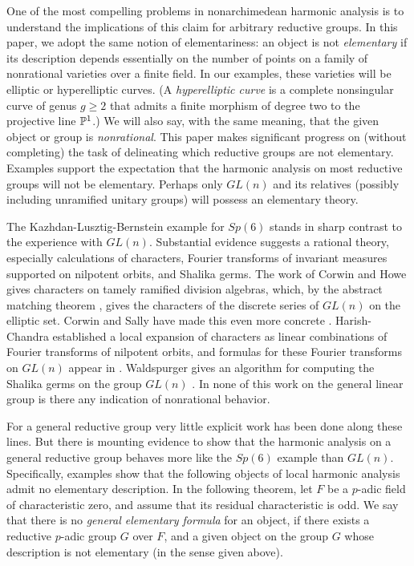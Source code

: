 \documentclass{amsart}
\begin{document}
One of the most compelling problems in nonarchimedean harmonic analysis
is to understand the implications of this
claim for arbitrary reductive groups.   In this 
paper, we adopt the same notion of elementariness: an object is
not {\it elementary\/} if its description depends essentially
on the number of points on a family of nonrational
varieties over a finite field.  In our examples, these varieties will be
elliptic or hyperelliptic curves.  (A {\it hyperelliptic curve} is a complete
nonsingular curve of genus $g\ge 2$ that admits a finite morphism
of degree two to the projective line ${\Bbb P}^1$.)
We will also say, with the same
meaning, that 
the given object or group is {\it nonrational}.
This paper makes significant progress on (without completing)
the task of delineating which reductive groups are not elementary.
Examples support the expectation
that the harmonic analysis on most reductive groups will not be elementary.
Perhaps only $GL(n)$ 
and its relatives (possibly including unramified unitary groups) 
will possess an elementary theory.

The Kazhdan-Lusztig-Bernstein example for $Sp(6)$ stands in sharp contrast to the
experience with $GL(n)$.   
Substantial evidence
suggests a rational theory, especially calculations of characters,
Fourier transforms of invariant measures supported
on nilpotent orbits, and Shalika germs.  
The work of Corwin and Howe \cite{CH} gives characters on tamely
ramified division algebras, which, by the abstract matching
theorem \cite{BDKV}, gives the characters of the discrete series 
of $GL(n)$ on the
elliptic set.  Corwin and Sally 
have made this even more concrete \cite{CS}.
Harish-Chandra established a local expansion of characters as linear
combinations of
Fourier transforms of nilpotent orbits, and 
formulas for these Fourier transforms on
$GL(n)$ appear in \cite{Ho}.  
Waldspurger gives an algorithm for computing the Shalika germs
on the group $GL(n)$ \cite{W1}.  In none of this work on the general linear
group is there any indication
of nonrational behavior.

For a general reductive group very little explicit work
has been done along
these lines.  But there is mounting evidence to show
that the harmonic analysis on a general reductive group behaves
more like the $Sp(6)$ example than $GL(n)$.  Specifically, 
examples show that the following objects of local harmonic
analysis admit no elementary description.
In the following theorem, let $F$ be a $p$-adic
field of characteristic zero, and assume that its residual
characteristic is odd. We say that there is no {\it general elementary
formula\/} for an object, if there exists a reductive $p$-adic group $G$
over $F$, and a given object on the group $G$ whose description
is not elementary (in the sense given above).
\end{document}
